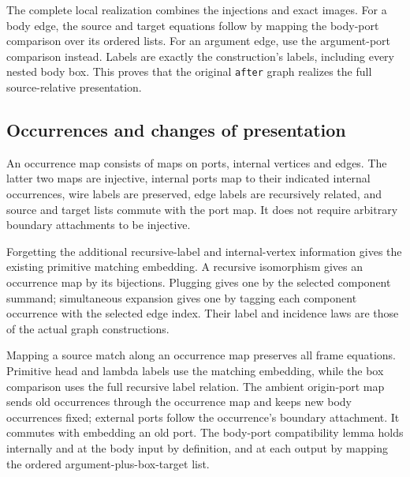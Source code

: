 

The complete local realization combines the injections and exact images.
For a body edge, the source and target equations follow by mapping the
body-port comparison over its ordered lists. For an argument edge, use the
argument-port comparison instead. Labels are exactly the construction's
labels, including every nested body box. This proves that the original
\texttt{after} graph realizes the full source-relative presentation.


\subsection{Occurrences and changes of presentation}

An occurrence map consists of maps on ports, internal vertices and edges.
The latter two maps are injective, internal ports map to their indicated
internal occurrences, wire labels are preserved, edge labels are recursively
related, and source and target lists commute with the port map. It does not
require arbitrary boundary attachments to be injective.


Forgetting the additional recursive-label and internal-vertex information
gives the existing primitive matching embedding. A recursive isomorphism gives
an occurrence map by its bijections. Plugging gives one by the selected
component summand; simultaneous expansion gives one by tagging each component
occurrence with the selected edge index. Their label and incidence laws are
those of the actual graph constructions.





Mapping a source match along an occurrence map preserves all frame equations.
Primitive head and lambda labels use the matching embedding, while the box
comparison uses the full recursive label relation. The ambient origin-port
map sends old occurrences through the occurrence map and keeps new body
occurrences fixed; external ports follow the occurrence's boundary attachment.
It commutes with embedding an old port. The body-port compatibility lemma
holds internally and at the body input by definition, and at each output by
mapping the ordered argument-plus-box-target list.

